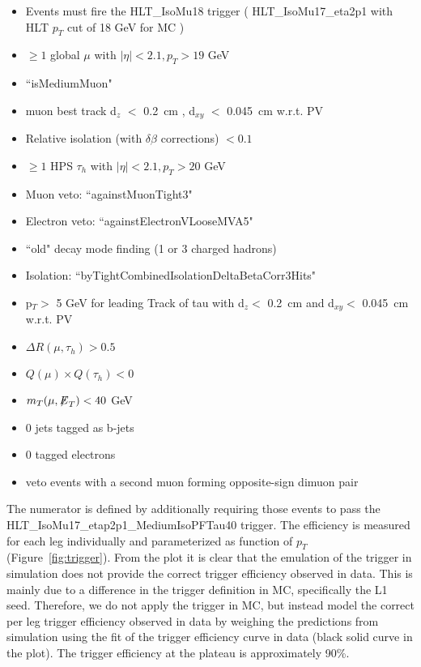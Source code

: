\begin{itemize}
  \item Events must fire the HLT{\_}IsoMu18 trigger ( HLT{\_}IsoMu17{\_}eta2p1 with HLT $p_T$ cut of 18 GeV for MC )
  \item $\ge 1$ global $\mu$ with $|\eta| < 2.1, p_{T} > 19$ GeV
  \item ``isMediumMuon"
  \item muon best track d$_{z}$ $<$ 0.2~cm , d$_{xy}$ $<$ 0.045~cm w.r.t. PV
  \item Relative isolation (with $\delta\beta$ corrections) $< 0.1$
  \item $\ge 1$ HPS $\tau_{h}$ with $|\eta| < 2.1, p_{T} > 20$ GeV
  \item Muon veto: ``againstMuonTight3"
  \item Electron veto: ``againstElectronVLooseMVA5"
  \item ``old" decay mode finding (1 or 3 charged hadrons)  %
  \item Isolation: ``byTightCombinedIsolationDeltaBetaCorr3Hits"
  \item p$_{T} >$ 5 GeV for leading Track of tau with d$_{z} <$ 0.2~cm and d$_{xy} <$ 0.045~cm w.r.t. PV
  \item $\Delta R(\mu,\tau_{h}) > 0.5$
  \item $Q(\mu) \times Q(\tau_{h}) < 0 $
  \item $m_{T}(\mu,{\not\mathrel{E}}_T) < 40$ GeV
  \item 0 jets tagged as b-jets
  \item 0 tagged electrons
  \item veto events with a second muon forming opposite-sign dimuon pair
\end{itemize}

The numerator is defined by additionally requiring those events to 
pass the \\
HLT{\_}IsoMu17{\_}etap2p1{\_}MediumIsoPFTau40 trigger. 
The efficiency is measured for each leg individually and
parameterized as function of $p_{T}$ (Figure~\ref{fig:trigger}). From the 
plot it is clear that the emulation of the trigger in simulation does not 
provide the correct trigger efficiency observed in data. This is mainly 
due to a difference in the trigger definition in MC, specifically the 
L1 seed. Therefore, we do not apply the trigger in MC, but instead model 
the correct per leg trigger efficiency observed in data by weighing the 
predictions from simulation using the fit of the trigger efficiency 
curve in data (black solid curve in the plot). The trigger efficiency at 
the plateau is approximately 90\%. 

